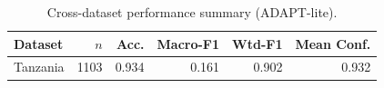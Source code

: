 \begin{table}[!t]
\centering
\caption{Cross-dataset performance summary (ADAPT-lite).}
\label{tab:cross_dataset_summary}
\begin{tabular}{lrrrrr}
\hline
Dataset & $n$ & Acc. & Macro-F1 & Wtd-F1 & Mean Conf.\\
\hline
Tanzania & 1103 & 0.934 & 0.161 & 0.902 & 0.932 \\
\hline
\end{tabular}
\end{table}
